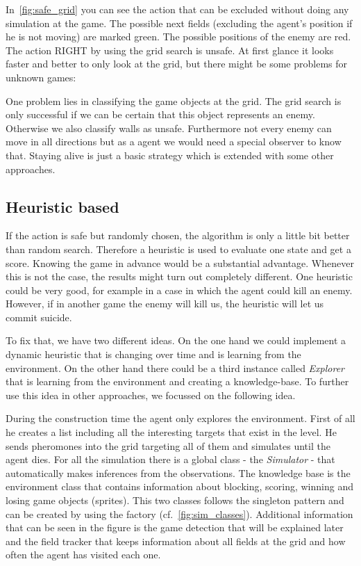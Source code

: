 In~\cref{fig:safe_grid} you can see the action that can be excluded without doing any simulation at the game.
The possible next fields (excluding the agent's position if he is not moving) are marked green. The possible positions
of the enemy are red. The action RIGHT by using the grid search is unsafe. 
At first glance it looks faster and better to only look at the grid, but there might be some problems for unknown games:

One problem lies in classifying the game objects at the grid. The grid search is only successful if we can be certain that this object represents an enemy. Otherwise we also classify walls as unsafe.
Furthermore not every enemy can move in all directions but as a agent we would need a special observer to know that.
Staying alive is just a basic strategy which is extended with some other approaches.




\subsection{Heuristic based} 
 
If the action is safe but randomly chosen, the algorithm is only a little bit better than random search.
Therefore a heuristic is used to evaluate one state and get a score. Knowing the game in advance would be a substantial advantage. Whenever this is not the case, the results might turn out completely different.
One heuristic could be very good, for example in a case in which the agent could kill an enemy. However, if in another game
the enemy will kill us, the heuristic will let us commit suicide.

To fix that, we have two different ideas. On the one hand we could implement a dynamic heuristic that is changing over time
and is learning from the environment. On the other hand there could be a third instance called \textit{Explorer} 
that is learning from the environment and creating a knowledge-base. 
To further use this idea in other approaches, we focussed on the following idea.

During the construction time the agent only explores the environment. 
First of all he creates a list including all the interesting targets that exist in the level. He sends pheromones into the grid targeting all of them and simulates until the agent dies. 
For all the simulation there is a global class - the \textit{Simulator} - that automatically makes inferences from the observations.
The knowledge base is the environment class that contains information about blocking, scoring, winning and losing game objects (sprites).
This two classes follows the singleton pattern and can be created by using the factory (cf.~\cref{fig:sim_classes}).
Additional information that can be seen in the figure is the game detection that will be explained later and the field tracker that keeps 
information about all fields at the grid and how often the agent has visited each one.

